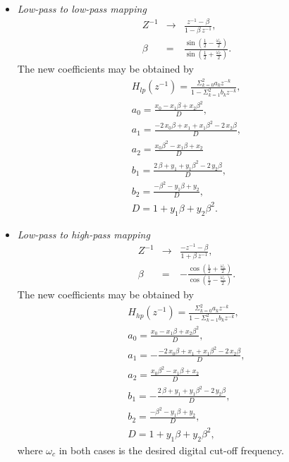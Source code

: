 \documentclass{sebase}
\begin{document}
\begin{itemize}
\item \textit{Low-pass to low-pass mapping} 
\begin{eqnarray}
Z^{-1} &\rightarrow &\frac{z^{-1}-\beta }{1-\beta \,z^{-1}},
\label{Z_low2low} \\
\beta &=&\frac{\sin \left( \frac{1}{2}-\frac{\omega _{c}}{2}\right) }{\sin
\left( \frac{1}{2}+\frac{\omega _{c}}{2}\right) }.  \label{Beta_low2low}
\end{eqnarray}
The new coefficients may be obtained by 
\begin{gather}
H_{lp}\left( z^{-1}\right) =\frac{\Sigma _{k=0}^{2}a_{k}z^{-k}}{1-\Sigma
_{k=1}^{2}b_{k}z^{-k}}, \\
a_{0}=\frac{x_{0}-x_{1}\beta +x_{2}\beta ^{2}}{D},  \label{a0_Low_Pass} \\
a_{1}=\frac{-2\,x_{0}\beta +x_{1}+x_{1}\beta ^{2}-2\,x_{2}\beta }{D},
\label{a1_Low_Pass} \\
a_{2}=\frac{x_{0}\beta ^{2}-x_{1}\beta +x_{2}}{D}  \label{a2_Low_Pass} \\
b_{1}=\frac{2\,\beta +y_{1}+y_{1}\beta ^{2}-2\,y_{2}\beta }{D},
\label{b1_Low_Pass} \\
b_{2}=\frac{-\beta ^{2}-y_{1}\beta +y_{2}}{D},  \label{b2_Low_Pass} \\
D=1+y_{1}\beta +y_{2}\beta ^{2}.  \label{D_Low_Pass}
\end{gather}

\item \textit{Low-pass to high-pass mapping} 
\begin{eqnarray}
Z^{-1} &\rightarrow &\frac{-z^{-1}-\beta }{1+\beta \,z^{-1}},
\label{Z_low2high} \\
\beta &=&-\frac{\cos \left( \frac{1}{2}+\frac{\omega _{c}}{2}\right) }{\cos
\left( \frac{1}{2}-\frac{\omega _{c}}{2}\right) }.  \label{Beta_low2high}
\end{eqnarray}
The new coefficients may be obtained by 
\begin{gather}
H_{hp}\left( z^{-1}\right) =\frac{\Sigma _{k=0}^{2}a_{k}z^{-k}}{1-\Sigma
_{k=1}^{2}b_{k}z^{-k}},  \label{a0_High_Pass} \\
a_{0}=\frac{x_{0}-x_{1}\beta +x_{2}\beta ^{2}}{D}, \\
a_{1}=-\frac{-2\,x_{0}\beta +x_{1}+x_{1}\beta ^{2}-2\,x_{2}\beta }{D},
\label{a1_High_Pass} \\
a_{2}=\frac{x_{0}\beta ^{2}-x_{1}\beta +x_{2}}{D}  \label{a2_High_Pass} \\
b_{1}=-\frac{2\,\beta +y_{1}+y_{1}\beta ^{2}-2\,y_{2}\beta }{D},
\label{b1_High_Pass} \\
b_{2}=\frac{-\beta ^{2}-y_{1}\beta +y_{2}}{D},  \label{b2_High_Pass} \\
D=1+y_{1}\beta +y_{2}\beta ^{2},  \label{D_High_Pass}
\end{gather}
where $\omega _{c}$ in both cases is the desired digital cut-off frequency.


\end{itemize}
\end{document}
